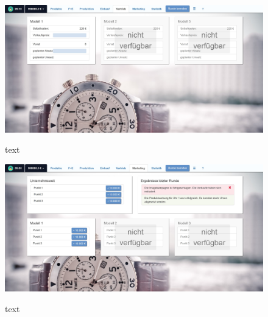 \begin{figure} [h]
	\centering
	\includegraphics[scale=0.1]{img/bilder_layout/Spiel7.jpg}
	\label{key}
	\caption{text} 
\end{figure}
\begin{figure} [h]
	\centering
	\includegraphics[scale=0.1]{img/bilder_layout/Spiel8.jpg}
	\label{key}
	\caption{text} 
\end{figure}